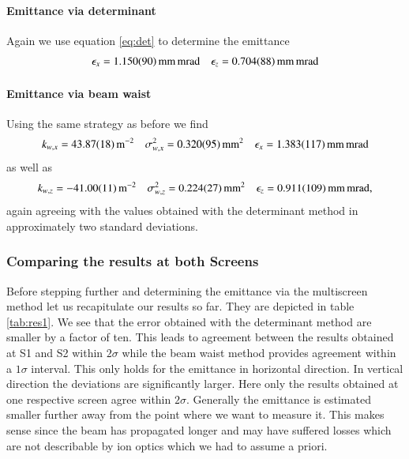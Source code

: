 \documentclass[11pt,a4paper,notitlepage]{scrartcl}
\begin{document}
\paragraph{Emittance via determinant}

Again we use equation \eqref{eq:det} to determine the emittance
\begin{align*}
	\epsilon_x=\SI{1.150\pm0.090}{\milli\m\milli\radian} && \epsilon_z=\SI{0.704\pm0.088}{\milli\m\milli\radian}
\end{align*} 
\paragraph{Emittance via beam waist}
Using the same strategy as before we find
\begin{align*}
	k_{w,x}=\SI{43.87 \pm 0.18 }{\m^{-2}}  &&\sigma_{w,x}^2=\SI{0.320\pm0.095}{\milli\m^2} && \epsilon_{x}=\SI{1.383\pm0.117}{\milli\m\milli\radian}
\end{align*}
as well as 
\begin{align*}
	k_{w,z}=\SI{-41.00 \pm 0.11 }{\m^{-2}}  &&\sigma_{w,z}^2=\SI{0.224\pm0.027}{\milli\m^2} && \epsilon_{z}=\SI{0.911\pm0.109}{\milli\m\milli\radian},
\end{align*}
again agreeing with the values obtained with the determinant method in approximately two standard deviations.
\subsubsection{Comparing the results at both Screens}
Before stepping further and determining the emittance via the multiscreen method let us recapitulate our results so far. They are depicted in table \ref{tab:res1}. We see that the error obtained with the determinant method are smaller by a factor of ten. This leads to agreement between the results obtained at S1 and S2 within $2\sigma$ while the beam waist method provides agreement within a $1\sigma$ interval. This only holds for the emittance in horizontal direction. In vertical direction the deviations are significantly larger. Here only the results obtained at one respective screen agree within $2\sigma$. Generally the emittance is estimated smaller further away from the point where we want to measure it. This makes sense since the beam has propagated longer and may have suffered losses which are not describable by ion optics which we had to assume a priori.
\end{document}

